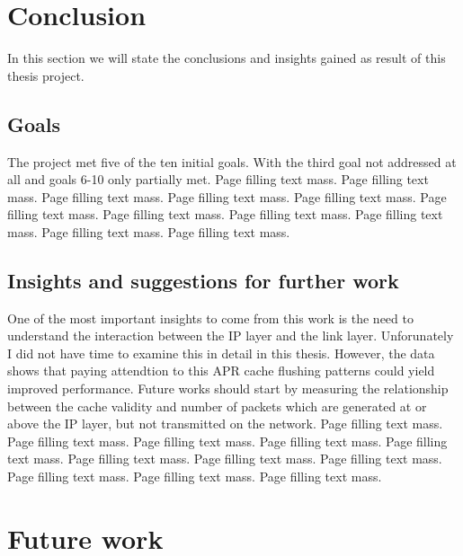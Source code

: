 \documentclass[12pt,a4paper,twoside,openright]{book}
\begin{document}
\section{Conclusion}


In this section we will state the conclusions and insights gained as result of this thesis project.

\subsection{Goals}
\label{ssec:goals}

The project met five of the ten initial goals. With the third goal not
addressed at all and goals 6-10 only partially met. Page filling text
mass. Page filling text mass. Page filling text mass. Page filling text
mass. Page filling text mass. Page filling text mass. Page filling text
mass. Page filling text mass. Page filling text mass. Page filling text
mass. Page filling text mass.


\subsection{Insights and suggestions for further work}
\label{ssec:insights-and-suggestions}

One of the most important insights to come from this work is the need to
understand the interaction between the IP layer and the link
layer. Unforunately I did not have time to examine this in detail in this
thesis. However, the data shows that paying attendtion to this APR cache
flushing patterns could yield improved performance. Future works should start
by measuring the relationship between the cache validity and number of packets
which are generated at or above the IP layer, but not transmitted on the
network.  Page filling text mass. Page filling text mass. Page filling text
mass. Page filling text mass. Page filling text mass. Page filling text
mass. Page filling text mass. Page filling text mass. Page filling text
mass. Page filling text mass. Page filling text mass.

\section{Future work}
\label{sec:future-work}
\end{document}
